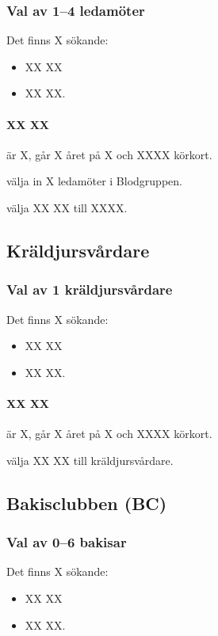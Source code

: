 \documentclass[hidelinks]{sektionsmote}
\begin{document}
\subsubsection{Val av 1--4 ledamöter}
Det finns X sökande:
\begin{itemize}
    \item XX XX
    \item XX XX.
\end{itemize}

\paragraph{XX XX} är X, går X året på X och XXXX körkort.

\begin{beslut}
  \item välja in X ledamöter i Blodgruppen.
\end{beslut}
\begin{beslut}
  \item välja XX XX till XXXX.
\end{beslut}


\subsection{Kräldjursvårdare}
\subsubsection{Val av 1 kräldjursvårdare}
Det finns X sökande:
\begin{itemize}
    \item XX XX
    \item XX XX.
\end{itemize}

\paragraph{XX XX} är X, går X året på X och XXXX körkort.

\begin{beslut}
  \item välja XX XX till kräldjursvårdare.
\end{beslut}


\subsection{Bakisclubben (BC)}
\subsubsection{Val av 0--6 bakisar}
Det finns X sökande:
\begin{itemize}
    \item XX XX
    \item XX XX.
\end{itemize}
\end{document}
